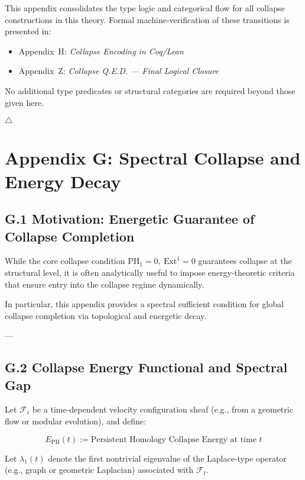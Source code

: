 \documentclass[11pt]{article}
\begin{document}
This appendix consolidates the type logic and categorical flow for all collapse constructions in this theory.  
Formal machine-verification of these transitions is presented in:

\begin{itemize}
    \item Appendix~H: \textit{Collapse Encoding in Coq/Lean}
    \item Appendix~Z: \textit{Collapse Q.E.D. — Final Logical Closure}
\end{itemize}

No additional type predicates or structural categories are required beyond those given here.

\hfill $\triangle$



\section*{Appendix G: Spectral Collapse and Energy Decay}

\subsection*{G.1 Motivation: Energetic Guarantee of Collapse Completion}

While the core collapse condition \( \mathrm{PH}_1 = 0, \ \mathrm{Ext}^1 = 0 \) guarantees collapse at the structural level,  
it is often analytically useful to impose energy-theoretic criteria that ensure entry into the collapse regime dynamically.  

In particular, this appendix provides a spectral sufficient condition for global collapse completion via topological and energetic decay.

---

\subsection*{G.2 Collapse Energy Functional and Spectral Gap}

Let \( \mathcal{F}_t \) be a time-dependent velocity configuration sheaf (e.g., from a geometric flow or modular evolution), and define:

\[
E_{\mathrm{PH}}(t) := \text{Persistent Homology Collapse Energy at time } t
\]

Let \( \lambda_1(t) \) denote the first nontrivial eigenvalue of the Laplace-type operator (e.g., graph or geometric Laplacian) associated with \( \mathcal{F}_t \).
\end{document}
